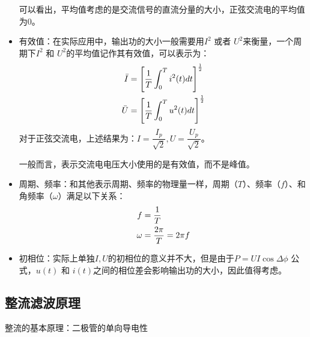 \documentclass[a4paper]{ltxdoc}
\begin{document}
\begin{multicols}{2}
\begin{itemize}
              可以看出，平均值考虑的是交流信号的直流分量的大小，正弦交流电的平均值为0。

        \item 有效值：在实际应用中，输出功的大小一般需要用$I^2$ 或者 $U^2$来衡量，一个周期下$I^2$ 和 $U^2$的平均值记作其有效值，可以表示为：
              \begin{equation}
                  \begin{aligned}
                      \bar I & = \left[\dfrac 1 T \int^{T} _{0} i^2(t) dt\right]^{\frac 1 2} \\
                      \bar U & = \left[\dfrac 1 T \int^{T} _{0} u^2(t) dt\right]^{\frac 1 2} \\
                  \end{aligned}
                  \notag
              \end{equation}
              对于正弦交流电，上述结果为：$I = \dfrac{I_p}{\sqrt 2}, U = \dfrac{U_p}{\sqrt 2}$。

              一般而言，表示交流电电压大小使用的是有效值，而不是峰值。

        \item 周期、频率：和其他表示周期、频率的物理量一样，周期（$T$）、频率（$f$）、和角频率（$\omega$）满足以下关系：
              \begin{equation}
                  \begin{aligned}
                      f      & = \dfrac 1 T               \\
                      \omega & = \dfrac{2\pi}{T} = 2\pi f \\
                  \end{aligned}
                  \notag
              \end{equation}
        \item 初相位：实际上单独$I,U$的初相位的意义并不大，但是由于$P = UI\cos{\Delta \phi}$ 公式，$u(t)$ 和 $i(t)$之间的相位差会影响输出功的大小，因此值得考虑。
    \end{itemize}

    \subsection{整流滤波原理}

    整流的基本原理：二极管的单向导电性


\end{multicols}
\end{document}
